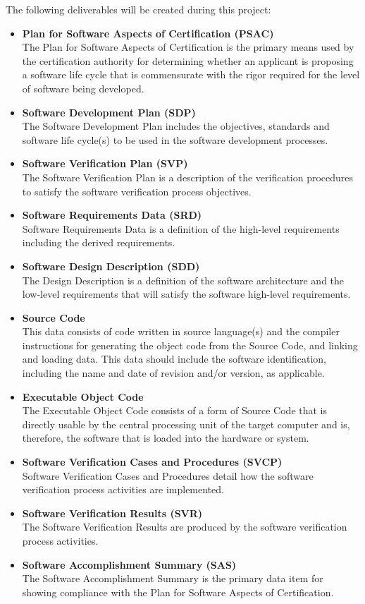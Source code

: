 \documentclass[a4paper]{article}
\begin{document}
The following deliverables will be created during this project:

\begin{itemize}
	\item \textbf{Plan for Software Aspects of Certification (PSAC)}\\
		The Plan for Software Aspects of Certification is the primary means used by the certification authority for determining whether an applicant is proposing a software life cycle that is commensurate with the rigor required for the level of software being developed.
	\item \textbf{Software Development Plan (SDP)}\\
		The Software Development Plan includes the objectives, standards and software life cycle(s) to be used in the software development processes.
	\item \textbf{Software Verification Plan (SVP)}\\
		The Software Verification Plan is a description of the verification procedures to satisfy the software verification process objectives.
	\item \textbf{Software Requirements Data (SRD)}\\
		Software Requirements Data is a definition of the high-level requirements including the derived requirements.
	\item \textbf{Software Design Description (SDD)}\\
		The Design Description is a definition of the software architecture and the low-level requirements that will satisfy the software high-level requirements.
	\item \textbf{Source Code}\\
		This data consists of code written in source language(s) and the compiler instructions for generating the object code from the Source Code, and linking and loading data. This data should include the software identification, including the name and date of revision and/or version, as applicable.
	\item \textbf{Executable Object Code}\\
		The Executable Object Code consists of a form of Source Code that is directly usable by the central processing unit of the target computer and is, therefore, the software that is loaded into the hardware or system.
	\item \textbf{Software Verification Cases and Procedures (SVCP)}\\
		Software Verification Cases and Procedures detail how the software verification process activities are implemented.
	\item \textbf{Software Verification Results (SVR)}\\
		The Software Verification Results are produced by the software verification process activities.
	\item \textbf{Software Accomplishment Summary (SAS)}\\
		The Software Accomplishment Summary is the primary data item for showing compliance with the Plan for Software Aspects of Certification.
\end{itemize}
\newpage
\end{document}
